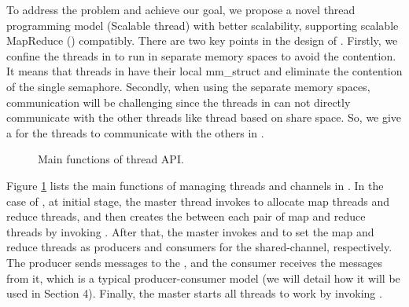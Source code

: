 To address the problem and achieve our goal, we propose a novel thread programming model \myth (Scalable thread) with better scalability, supporting scalable MapReduce (\myds) compatibly.
There are two key points in the design of \myth.
Firstly, we confine the threads in \myth to run in separate memory spaces to avoid the contention.
It means that threads in \myth have their local mm\_struct and eliminate the contention of the single semaphore.
Secondly, when using the separate memory spaces, communication will be challenging since the threads in \myth can not directly communicate with the other threads like thread based on share space.
So, we give a  for the threads to communicate with the others in \myth. 




\label{sec:pm:thread}
\begin{figure}[htpb]

\caption{Main functions of \myds thread API.}
\label{fig:api:thread}
\end{figure}

Figure \ref{fig:api:thread} lists the main functions of managing threads and channels in \myth.
In the case of \myds, at initial stage, the master thread invokes  to allocate map threads and reduce threads, and then creates the   between each pair of map and reduce threads by invoking .
After that, the master invokes  and  to set the map and reduce threads as producers and consumers for the shared-channel, respectively.
The producer sends messages to the , and the consumer receives the messages from it,
which is a typical producer-consumer model (we will detail how it will be used in Section 4). 
Finally, the master starts all threads to work by invoking .

